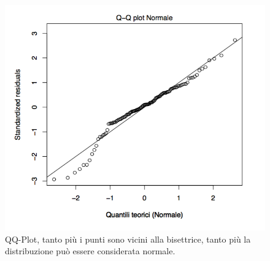 \begin{figure}[htbp]
	\centering
	\includegraphics[width=.6\textwidth]{./notes/immagini/l6-fig14-1.png}
	\caption{QQ-Plot, tanto più i punti sono vicini alla bisettrice, tanto più la distribuzione può essere considerata normale.}
\end{figure}



